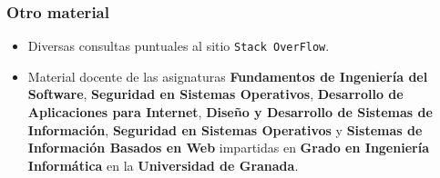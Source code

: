 \bigskip
\subsubsection*{Otro material}
\begin{itemize}
	\item Diversas consultas puntuales al sitio {\tt Stack OverFlow}.
	\item Material docente de las asignaturas \textbf{Fundamentos de Ingeniería del Software}, \textbf{Seguridad en Sistemas Operativos}, \textbf{Desarrollo de Aplicaciones para Internet}, \textbf{Diseño y Desarrollo de Sistemas de Información}, \textbf{Seguridad en Sistemas Operativos} y \textbf{Sistemas de Información Basados en Web} impartidas en \textbf{Grado en Ingeniería Informática} en la \textbf{Universidad de Granada}.
\end{itemize}